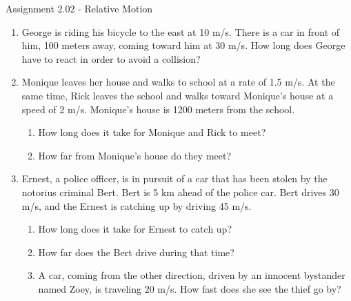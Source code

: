 \documentclass[letterpaper, 12pt]{article}
\begin{document}


\begin{center} Assignment 2.02 - Relative Motion
\end{center}





\begin{enumerate}
\item George is riding his bicycle to the east at 10 m/s.  There is a car in front of him, 100 meters away, coming toward him at 30 m/s.  How long does George have to react in order to avoid a collision?
\vspace{0.75in}
\item Monique leaves her house and walks to school at a rate of 1.5 m/s.  At the same time, Rick leaves the school and walks toward Monique's house at a speed of 2 m/s.  Monique's house is 1200 meters from the school.
\begin{enumerate} \item How long does it take for Monique and Rick to meet?
	\vspace{0.75in}
	\item How far from Monique's house do they meet?
\end{enumerate}
\vspace{0.75in}
\item Ernest, a police officer, is in pursuit of a car that has been stolen by the notorius criminal Bert.  Bert is 5 km ahead of the police car.  Bert drives 30 m/s, and the Ernest is catching up by driving 45 m/s.  
\begin{enumerate}
	\item How long does it take for Ernest to catch up?
	\vspace{0.75in}
	\item How far does the Bert drive during that time?
	\vspace{0.75in}
	\item A car, coming from the other direction, driven by an innocent bystander named Zoey, is traveling 20 m/s.  How fast does she see the thief go by?
\end{enumerate}



\end{enumerate}
\end{document}
